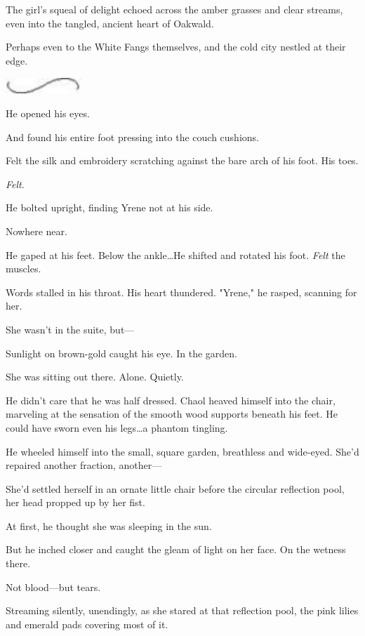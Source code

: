 The girl's squeal of delight echoed across the amber grasses and clear streams, even into the tangled, ancient heart of Oakwald.

Perhaps even to the White Fangs themselves, and the cold city nestled at their edge.

\begin{center}
	\includegraphics[width=1.12in,height=0.24in]{images/seperator}
\end{center}

He opened his eyes.

And found his entire foot pressing into the couch cushions.

Felt the silk and embroidery scratching against the bare arch of his foot.
His toes.

\emph{Felt}.

He bolted upright, finding Yrene not at his side.

Nowhere near.

He gaped at his feet.
Below the ankle\ldots He shifted and rotated his foot.
\emph{Felt} the muscles.

Words stalled in his throat.
His heart thundered.
"Yrene," he rasped, scanning for her.

She wasn't in the suite, but---

Sunlight on brown-gold caught his eye.
In the garden.

She was sitting out there.
Alone.
Quietly.

He didn't care that he was half dressed.
Chaol heaved himself into the chair, marveling at the sensation of the smooth wood supports beneath his feet.
He could have sworn even his legs\ldots a phantom tingling.

He wheeled himself into the small, square garden, breathless and wide-eyed.
She'd repaired another fraction, another---

She'd settled herself in an ornate little chair before the circular reflection pool, her head propped up by her fist.

At first, he thought she was sleeping in the sun.

But he inched closer and caught the gleam of light on her face.
On the wetness there.

Not blood---but tears.

Streaming silently, unendingly, as she stared at that reflection pool, the pink lilies and emerald pads covering most of it.


